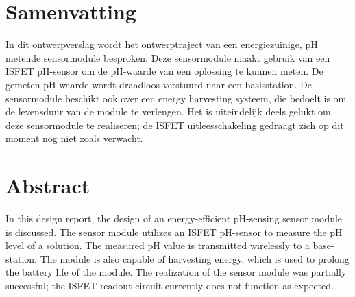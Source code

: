 \section*{Samenvatting}
In dit ontwerpverslag wordt het ontwerptraject van een energiezuinige, pH metende sensormodule besproken. Deze sensormodule maakt gebruik van een ISFET pH-sensor om de pH-waarde van een oplossing te kunnen meten.
De gemeten pH-waarde wordt draadloos verstuurd naar een basisstation. De sensormodule beschikt ook over een energy harvesting systeem, die bedoelt is om de levensduur van de module te verlengen.
Het is uiteindelijk deels gelukt om deze sensormodule te realiseren; de ISFET uitleesschakeling gedraagt zich op dit moment nog niet zoals verwacht.

\section*{Abstract}
In this design report, the design of an energy-efficient pH-sensing sensor module is discussed. The sensor module utilizes an ISFET pH-sensor to measure the pH level of a solution.
The measured pH value is transmitted wirelessly to a base-station. The module is also capable of harvesting energy, which is used to prolong the battery life of the module.
The realization of the sensor module was partially successful; the ISFET readout circuit currently does not function as expected.
